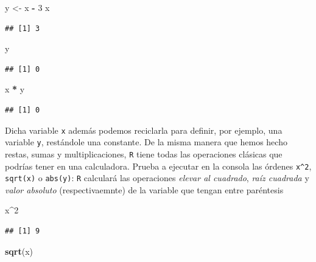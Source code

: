 \documentclass[11pt,]{book}
\newenvironment{Shaded}{\begin{snugshade}}{\end{snugshade}}
\newcommand{\DecValTok}[1]{\textcolor[rgb]{0.06,0.06,0.06}{#1}}
\newcommand{\KeywordTok}[1]{\textcolor[rgb]{0.27,0.27,0.27}{\textbf{#1}}}
\newcommand{\NormalTok}[1]{#1}
\newcommand{\OperatorTok}[1]{\textcolor[rgb]{0.43,0.43,0.43}{\textbf{#1}}}
\newcommand{\StringTok}[1]{\textcolor[rgb]{0.5,0.5,0.5}{#1}}
\begin{document}
\begin{Shaded}
\begin{Highlighting}[]
\NormalTok{y <-}\StringTok{ }\NormalTok{x }\OperatorTok{-}\StringTok{ }\DecValTok{3}
\NormalTok{x}
\end{Highlighting}
\end{Shaded}

\begin{verbatim}
## [1] 3
\end{verbatim}

\begin{Shaded}
\begin{Highlighting}[]
\NormalTok{y}
\end{Highlighting}
\end{Shaded}

\begin{verbatim}
## [1] 0
\end{verbatim}

\begin{Shaded}
\begin{Highlighting}[]
\NormalTok{x }\OperatorTok{*}\StringTok{ }\NormalTok{y}
\end{Highlighting}
\end{Shaded}

\begin{verbatim}
## [1] 0
\end{verbatim}

Dicha variable \texttt{x} además podemos reciclarla para definir, por ejemplo, una variable \texttt{y}, restándole una constante. De la misma manera que hemos hecho restas, sumas y multiplicaciones, \texttt{R} tiene todas las operaciones clásicas que podrías tener en una calculadora. Prueba a ejecutar en la consola las órdenes \texttt{x\^{}2}, \texttt{sqrt(x)} o \texttt{abs(y)}: \texttt{R} calculará las operaciones \emph{elevar al cuadrado}, \emph{raíz cuadrada} y \emph{valor absoluto} (respectivaemnte) de la variable que tengan entre paréntesis

\begin{Shaded}
\begin{Highlighting}[]
\NormalTok{x}\OperatorTok{^}\DecValTok{2}
\end{Highlighting}
\end{Shaded}

\begin{verbatim}
## [1] 9
\end{verbatim}

\begin{Shaded}
\begin{Highlighting}[]
\KeywordTok{sqrt}\NormalTok{(x)}
\end{Highlighting}
\end{Shaded}
\end{document}
